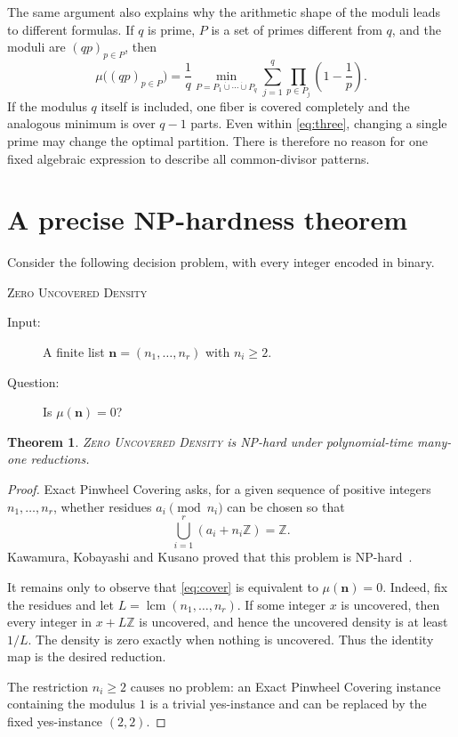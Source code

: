 \documentclass[a4paper,11pt]{article}
\newtheorem{theorem}[question]{Theorem}
\newcommand{\Z}{\mathbb Z}
\newcommand{\lcmop}{\operatorname{lcm}}
\begin{document}
The same argument also explains why the arithmetic shape of the moduli leads
to different formulas.  If $q$ is prime, $P$ is a set of primes different
from $q$, and the moduli are $(qp)_{p\in P}$, then
\begin{equation}\label{eq:q}
 \mu\bigl((qp)_{p\in P}\bigr)=
 \frac1q
 \min_{P=P_1\mathbin{\dot\cup}\cdots\mathbin{\dot\cup}P_q}
 \sum_{j=1}^q\prod_{p\in P_j}\left(1-\frac1p\right).
\end{equation}
If the modulus $q$ itself is included, one fiber is covered completely and
the analogous minimum is over $q-1$ parts.  Even within \eqref{eq:three},
changing a single prime may change the optimal partition.  There is therefore
no reason for one fixed algebraic expression to describe all common-divisor
patterns.

\section{A precise NP-hardness theorem}\label{sec:NPhard}

Consider the following decision problem, with every integer encoded in binary.

\medskip
\noindent
\textsc{Zero Uncovered Density}

\begin{description}
 \item[Input:] A finite list $\mathbf n=(n_1,\ldots,n_r)$ with $n_i\geq2$.
 \item[Question:] Is $\mu(\mathbf n)=0$?
\end{description}

\begin{theorem}\label{thm:np}
\textnormal{\textsc{Zero Uncovered Density}} is NP-hard under polynomial-time many-one
reductions.
\end{theorem}

\begin{proof}
Exact Pinwheel Covering asks, for a given sequence of positive integers
$n_1,\ldots,n_r$, whether residues $a_i\pmod {n_i}$ can be chosen so that
\begin{equation}\label{eq:cover}
 \bigcup_{i=1}^r(a_i+n_i\Z)=\Z.
\end{equation}
Kawamura, Kobayashi and Kusano proved that this problem is
NP-hard~\cite[Theorem~3]{KKK25}.

It remains only to observe that \eqref{eq:cover} is equivalent to
$\mu(\mathbf n)=0$.  Indeed, fix the residues and let
$L=\lcmop(n_1,\ldots,n_r)$.  If some integer $x$ is uncovered, then every
integer in $x+L\Z$ is uncovered, and hence the uncovered density is at least
$1/L$.  The density is zero exactly when nothing is uncovered.  Thus the
identity map is the desired reduction.

The restriction $n_i\geq2$ causes no problem: an Exact Pinwheel Covering
instance containing the modulus $1$ is a trivial yes-instance and can be
replaced by the fixed yes-instance $(2,2)$.
\end{proof}
\end{document}
